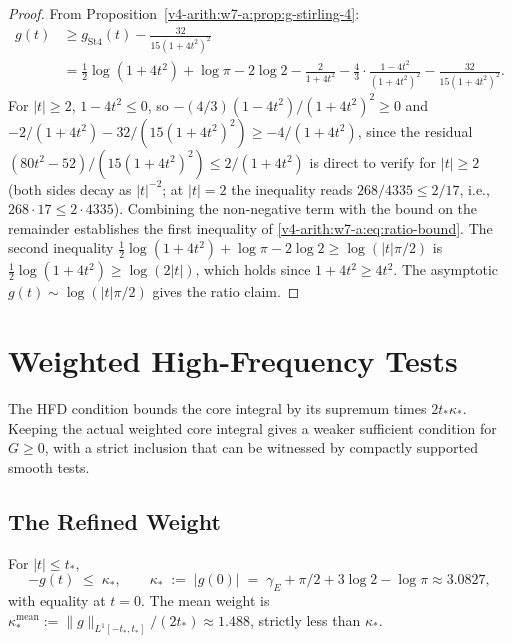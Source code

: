 \begin{proof}
From Proposition~\ref{v4-arith:w7-a:prop:g-stirling-4}:
\begin{align*}
g(t)&\geq g_{\mathrm{St4}}(t)-\frac{32}{15(1+4t^{2})^{2}}\\
&=\tfrac{1}{2}\log(1+4t^{2})+\log\pi-2\log 2-\frac{2}{1+4t^{2}}-\frac{4}{3}\cdot\frac{1-4t^{2}}{(1+4t^{2})^{2}}-\frac{32}{15(1+4t^{2})^{2}}.
\end{align*}
For \(|t|\geq 2\), \(1-4t^{2}\leq 0\), so \(-(4/3)(1-4t^{2})/(1+4t^{2})^{2}\geq 0\) and
\(-2/(1+4t^{2})-32/(15(1+4t^{2})^{2})\geq -4/(1+4t^{2})\), since the residual
\((80t^{2}-52)/(15(1+4t^{2})^{2})\leq 2/(1+4t^{2})\) is direct to verify for
\(|t|\geq 2\) (both sides decay as \(|t|^{-2}\); at \(|t|=2\) the inequality
reads \(268/4335\leq 2/17\), i.e., \(268\cdot 17\leq 2\cdot 4335\)).
Combining the non-negative term with the bound on the remainder
establishes the first inequality of \eqref{v4-arith:w7-a:eq:ratio-bound}.
The second inequality \(\tfrac{1}{2}\log(1+4t^{2})+\log\pi-2\log 2\geq\log(|t|\pi/2)\)
is \(\tfrac{1}{2}\log(1+4t^{2})\geq\log(2|t|)\), which holds since
\(1+4t^{2}\geq 4t^{2}\). The asymptotic \(g(t)\sim\log(|t|\pi/2)\)
gives the ratio claim.
\end{proof}

\section{Weighted High-Frequency Tests}
\label{v4-arith:w7-a:SHF-class}

The HFD condition bounds the core integral by its supremum times
\(2t_*\kappa_*\). Keeping the actual weighted core integral gives
a weaker sufficient condition for \(G\ge0\), with a strict inclusion
that can be witnessed by compactly supported smooth tests.

\subsection{The Refined Weight}
\label{v4-arith:w7-a:SHF-class:weight}

\begin{lemma}
\label{v4-arith:w7-a:lem:refined-core}
For \(|t|\leq t_{\ast}\),
\begin{equation}
\label{v4-arith:w7-a:eq:refined-core}
-g(t)\;\leq\;\kappa_{\ast},
\qquad \kappa_{\ast}\;:=\;|g(0)|\;=\;\gamma_{E}+\pi/2+3\log 2-\log\pi\approx 3.0827,
\end{equation}
with equality at \(t=0\). The mean weight is
\(\kappa_{\ast}^{\mathrm{mean}}:=\|g\|_{L^{1}[-t_{\ast},t_{\ast}]}/(2t_{\ast})\approx 1.488\),
strictly less than \(\kappa_{\ast}\).
\end{lemma}

